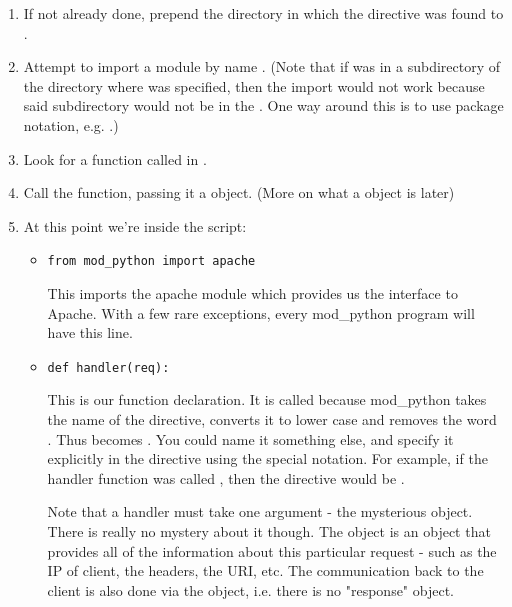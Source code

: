 \begin{enumerate}

\item
If not already done, prepend the directory in which the
 directive was found to .

\item
Attempt to import a module by name . (Note that if
 was in a subdirectory of the directory where
 was specified, then the import would not work
because said subdirectory would not be in the . One way
around this is to use package notation, e.g. .)

\item 
Look for a function called  in .

\item
Call the function, passing it a  object. (More on what a
 object is later)

\item
At this point we're inside the script: 

\begin{itemize}

\item
\begin{verbatim}
from mod_python import apache
\end{verbatim}

This imports the apache module which provides us the interface to
Apache. With a few rare exceptions, every mod_python program will have
this line.

\item
\begin{verbatim}
def handler(req):
\end{verbatim}

This is our  function declaration. It is called
 because mod_python takes the name of the directive,
converts it to lower case and removes the word . Thus
 becomes . You could name it 
something else, and specify it explicitly in the directive using the
special \samp{::} notation. For example, if the handler function was
called , then the directive would be
.

Note that a handler must take one argument - the mysterious
 object. There is really no mystery about it though.  The
 object is an object that provides all of the information
about this particular request - such as the IP of client, the headers,
the URI, etc. The communication back to the client is also done via
the  object, i.e. there is no "response" object.


\end{itemize}
\end{enumerate}
